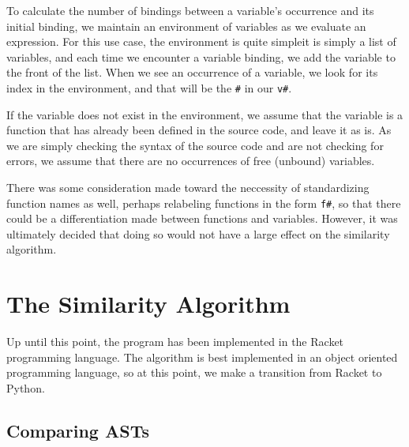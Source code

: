 \documentclass[12pt]{article}
\newcommand{\key}[1]{\texttt{#1}}
\begin{document}
\hfill

To calculate the number of bindings between a variable's occurrence and its initial binding, we maintain an environment of variables as we evaluate an expression. For this use case, the environment is quite simple\textemdash it is simply a list of variables, and each time we encounter a variable binding, we add the variable to the front of the list. When we see an occurrence of a variable, we look for its index in the environment, and that will be the \key{\#} in our \key{v\#}.

\hfill

If the variable does not exist in the environment, we assume that the variable is a function that has already been defined in the source code, and leave it as is. As we are simply checking the syntax of the source code and are not checking for errors, we assume that there are no occurrences of free (unbound) variables.

\hfill

There was some consideration made toward the neccessity of standardizing function names as well, perhaps relabeling functions in the form \key{f\#}, so that there could be a differentiation made between functions and variables. However, it was ultimately decided that doing so would not have a large effect on the similarity algorithm.

\section{The Similarity Algorithm}

Up until this point, the program has been implemented in the Racket programming language. The algorithm is best implemented in an object oriented programming language, so at this point, we make a transition from Racket to Python.

\subsection{Comparing ASTs}
\end{document}
